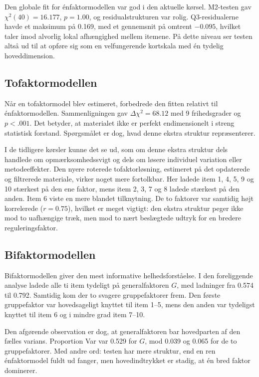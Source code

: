 \documentclass[11pt,a4paper]{article}
\begin{document}
Den globale fit for énfaktormodellen var god i den aktuelle kørsel. M2-testen gav $\chi^2(40)=16.177$, $p=1.00$, og residualstrukturen var rolig. Q3-residualerne havde et maksimum på 0.169, med et gennemsnit på omtrent $-0.095$, hvilket taler imod alvorlig lokal afhængighed mellem itemene. På dette niveau ser testen altså ud til at opføre sig som en velfungerende kortskala med én tydelig hoveddimension.

\subsection{Tofaktormodellen}
Når en tofaktormodel blev estimeret, forbedrede den fitten relativt til énfaktormodellen. Sammenligningen gav $\Delta \chi^2 = 68.12$ med 9 frihedsgrader og $p < .001$. Det betyder, at materialet ikke er perfekt endimensionelt i streng statistisk forstand. Spørgsmålet er dog, hvad denne ekstra struktur repræsenterer.

I de tidligere kørsler kunne det se ud, som om denne ekstra struktur dels handlede om opmærksomhedssvigt og dels om løsere individuel variation eller metodeeffekter. Den nyere roterede tofaktorløsning, estimeret på det opdaterede og filtrerede materiale, virker noget mere fortolkbar. Her ladede item 1, 4, 5, 9 og 10 stærkest på den ene faktor, mens item 2, 3, 7 og 8 ladede stærkest på den anden. Item 6 viste en mere blandet tilknytning. De to faktorer var samtidig højt korrelerede ($r = 0.75$), hvilket er meget vigtigt: den ekstra struktur peger ikke mod to uafhængige træk, men mod to nært beslægtede udtryk for en bredere reguleringsfaktor.

\subsection{Bifaktormodellen}
Bifaktormodellen giver den mest informative helhedsforståelse. I den foreliggende analyse ladede alle ti item tydeligt på generalfaktoren $G$, med ladninger fra 0.574 til 0.792. Samtidig kom der to svagere gruppefaktorer frem. Den første gruppefaktor var hovedsageligt knyttet til item 1--5, mens den anden var tydeligst knyttet til item 6 og i mindre grad item 7--10.

Den afgørende observation er dog, at generalfaktoren bar hovedparten af den fælles varians. Proportion Var var 0.529 for $G$, mod 0.039 og 0.065 for de to gruppefaktorer. Med andre ord: testen har mere struktur, end en ren énfaktormodel fuldt ud fanger, men hovedindtrykket er stadig, at én bred faktor dominerer.
\end{document}
